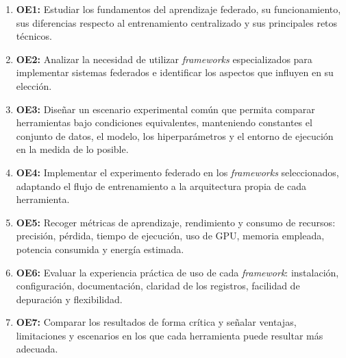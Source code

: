 \begin{enumerate}
  \item \textbf{OE1:} Estudiar los fundamentos del aprendizaje federado, su
        funcionamiento, sus diferencias respecto al entrenamiento centralizado y sus
        principales retos técnicos.
  \item \textbf{OE2:} Analizar la necesidad de utilizar \textit{frameworks}
        especializados para implementar sistemas federados e identificar los aspectos
        que influyen en su elección.
  \item \textbf{OE3:} Diseñar un escenario experimental común que permita comparar
        herramientas bajo condiciones equivalentes, manteniendo constantes el conjunto
        de datos, el modelo, los hiperparámetros y el entorno de ejecución en la medida
        de lo posible.
  \item \textbf{OE4:} Implementar el experimento federado en los \textit{frameworks}
        seleccionados, adaptando el flujo de entrenamiento a la arquitectura propia de
        cada herramienta.
  \item \textbf{OE5:} Recoger métricas de aprendizaje, rendimiento y consumo de
        recursos: precisión, pérdida, tiempo de ejecución, uso de GPU, memoria empleada,
        potencia consumida y energía estimada.
  \item \textbf{OE6:} Evaluar la experiencia práctica de uso de cada \textit{framework}:
        instalación, configuración, documentación, claridad de los registros, facilidad
        de depuración y flexibilidad.
  \item \textbf{OE7:} Comparar los resultados de forma crítica y señalar ventajas,
        limitaciones y escenarios en los que cada herramienta puede resultar más
        adecuada.
\end{enumerate}
